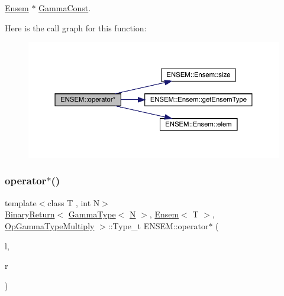 \mbox{\hyperlink{classENSEM_1_1Ensem}{Ensem}} $\ast$ \mbox{\hyperlink{classENSEM_1_1GammaConst}{Gamma\+Const}}. 

Here is the call graph for this function\+:\nopagebreak
\begin{figure}[H]
\begin{center}
\leavevmode
\includegraphics[width=350pt]{d1/d9e/group__eensem_gaada3f84ca5744bafe60557482cc90c26_cgraph}
\end{center}
\end{figure}
\mbox{\label{group__eensem_ga399b896691f2d528edcade561c6e571d}} 
\subsubsection{\texorpdfstring{operator$\ast$()}{operator*()}\hspace{0.1cm}{\footnotesize\ttfamily [6/11]}}
{\footnotesize\ttfamily template$<$class T , int N$>$ \\
\mbox{\hyperlink{structENSEM_1_1BinaryReturn}{Binary\+Return}}$<$ \mbox{\hyperlink{classENSEM_1_1GammaType}{Gamma\+Type}}$<$ \mbox{\hyperlink{operator__name__util_8cc_a7722c8ecbb62d99aee7ce68b1752f337}{N}} $>$, \mbox{\hyperlink{classENSEM_1_1Ensem}{Ensem}}$<$ T $>$, \mbox{\hyperlink{structENSEM_1_1OpGammaTypeMultiply}{Op\+Gamma\+Type\+Multiply}} $>$\+::Type\+\_\+t E\+N\+S\+E\+M\+::operator$\ast$ (\begin{DoxyParamCaption}\item[{const \mbox{\hyperlink{classENSEM_1_1GammaType}{Gamma\+Type}}$<$ \mbox{\hyperlink{operator__name__util_8cc_a7722c8ecbb62d99aee7ce68b1752f337}{N}} $>$ \&}]{l,  }\item[{const \mbox{\hyperlink{classENSEM_1_1Ensem}{Ensem}}$<$ T $>$ \&}]{r }\end{DoxyParamCaption})\hspace{0.3cm}{\ttfamily [inline]}}



